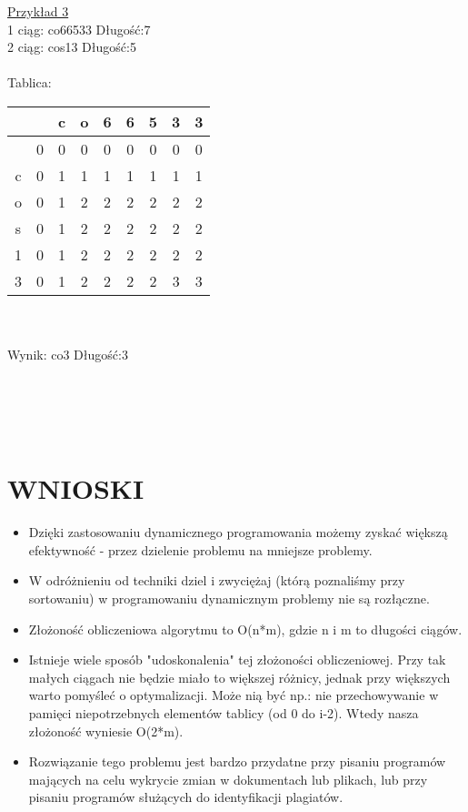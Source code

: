\documentclass[11pt]{article}
\begin{document}
\underline{Przykład 3}
 \\ 1 ciąg: co66533      Długość:7\\
 	2 ciąg: cos13			Długość:5 \\ \\
 	Tablica: \\
	\begin{tabular}{|c|c|c|c|c|c|c|c|c|}
  \hline
   & &c&o&6&6&5&3&3 \\
  \hline
   &0&0&0&0&0&0&0&0 \\ \hline
   c&0&1&1&1&1&1&1&1\\ \hline
   o&0&1&2&2&2&2&2&2 \\ \hline
   s&0&1&2&2&2&2&2&2 \\ \hline
   1&0&1&2&2&2&2&2&2\\ \hline
   3&0&1&2&2&2&2&3&3 \\ \hline
  
  \end{tabular}
  \\\\ Wynik: co3			Długość:3
  \\ \\ \\ \\ \\


\section{WNIOSKI}
\begin{itemize}
\item Dzięki zastosowaniu dynamicznego programowania możemy zyskać większą efektywność - przez dzielenie problemu na mniejsze problemy. 
\item W odróżnieniu od techniki dziel i zwyciężaj (którą poznaliśmy przy sortowaniu) w programowaniu dynamicznym problemy nie są rozłączne.
\item Złożoność obliczeniowa algorytmu to O(n*m), gdzie n i m to długości ciągów.
\item Istnieje wiele sposób "udoskonalenia" tej złożoności obliczeniowej. Przy tak małych ciągach nie będzie miało to większej różnicy, jednak przy większych warto pomyśleć o optymalizacji. Może nią być np.: nie przechowywanie w pamięci niepotrzebnych elementów tablicy (od 0 do i-2). Wtedy nasza złożoność wyniesie O(2*m).
\item Rozwiązanie tego problemu jest bardzo przydatne przy pisaniu programów mających na celu wykrycie zmian w dokumentach lub plikach, lub przy pisaniu programów służących do identyfikacji plagiatów.
\end{itemize}
\end{document}
